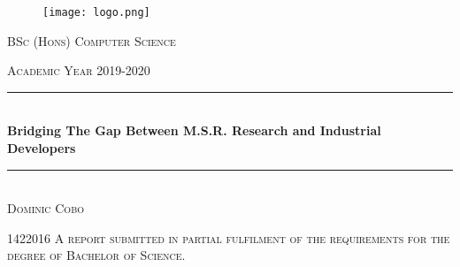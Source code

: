 \documentclass[a4paper, 10pt]{report}
\newcommand{\fypCourse}{BSc (Hons) Computer Science}
\newcommand{\fypStudent}{Dominic Cobo}
\newcommand{\fypStudentId}{1422016}
\newcommand{\fypAcademicYear}{2019-2020}
\newcommand{\fypTitle}{Bridging The Gap Between M.S.R. Research and Industrial Developers}
\begin{document}
	\begin{titlepage}
		\centering
		\begin{figure}
			\texttt{[image: logo.png]}
		\end{figure}
		\textsc{\large \fypCourse}
		
		\textsc{\large Academic Year \fypAcademicYear}
		
		\rule{\linewidth}{0.5mm} \\[0.5cm]
		{ \huge\textbf { \fypTitle } } \\
		\rule{\linewidth}{0.5mm} \\[6cm]
		
		
		\textsc{\large \fypStudent}
		
		\textsc{\large \fypStudentId}
		\textsc{A report submitted in partial fulfilment of the requirements for the degree of Bachelor of Science.}
		
	\end{titlepage}
	
	\newpage
	
	
	
	
	
	
	
	
	
	
	
\end{document}
